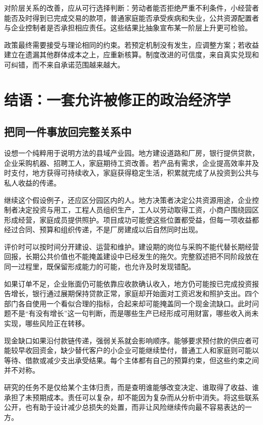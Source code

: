 \documentclass[UTF8,fontset=fandol,zihao=-4,oneside,openany]{ctexbook}
\begin{document}
对阶层关系的改善，应从可行选择判断：劳动者能否拒绝严重不利条件，小经营者能否及时得到已完成交易的款项，普通家庭能否承受疾病和失业，公共资源配置者与企业控制者是否承担相应责任。这些结果比抽象宣布某一阶层上升更可检验。

政策最终需要接受与理论相同的约束。若预定机制没有发生，应调整方案；若收益建立在遗漏其他群体成本之上，应重新核算。制度改进的可信度，来自真实兑现和可纠错，而不来自承诺范围越来越大。

\chapter*{结语：一套允许被修正的政治经济学}
\section*{把同一件事放回完整关系中}
设想一个纯粹用于说明方法的县域产业园。地方建设道路和厂房，银行提供贷款，企业采购机器、招聘工人，家庭期待工资改善。若产品有需求，企业提高效率并及时支付，地方获得可持续收入，家庭获得稳定生活，积累就完成了从投资到公共与私人收益的传递。

\label{arg:P281}
继续这个假设例子，还应区分园区内的人。地方决策者决定公共资源用途，企业控制者决定投资与用工，工程人员组织生产，工人以劳动取得工资，小商户围绕园区形成经营，家庭成员提供照护。项目成功可能使这些位置都受益，但每一项收益都经过合同、预算和组织传递，不是厂房建成以后自然同时出现。

评价时可以按时间分开建设、运营和维护。建设期的岗位与采购不能代替长期经营回报，长期公共价值也不能掩盖建设中已经发生的拖欠。完整叙述把不同阶段放在同一过程里，既保留形成能力的可能，也允许及时发现错配。

如果订单不足，企业账面仍可能依靠应收款确认收入，地方仍可能按已完成投资报告增长，银行通过展期保持贷款正常，家庭却开始面对工资迟发和照护支出。四个部门各自使用一个看似合理的指标，合起来却可能掩盖同一个现金流缺口。此时问题不是“有没有增长”这一句判断，而是哪些生产已经形成可用财富，哪些收入尚未实现，哪些风险正在转移。

\label{arg:P282}
现金缺口如果沿付款链传递，强弱关系就会影响顺序。能够要求预付款的供应者可能较早收回资金，缺少替代客户的小企业可能继续垫付，普通工人和家庭则可能以等待、借款或减少支出承受结果。每个主体都有自己的预算约束，但这些约束之间并不对称。

研究的任务不是仅给某个主体归责，而是查明谁能够改变决定、谁取得了收益、谁承担了未预期成本。责任可以复杂，却不能因为复杂而从分析中消失。将这些联系公开，也有助于设计减少总损失的处置，而非让风险继续传向最不容易表达的一方。
\end{document}
